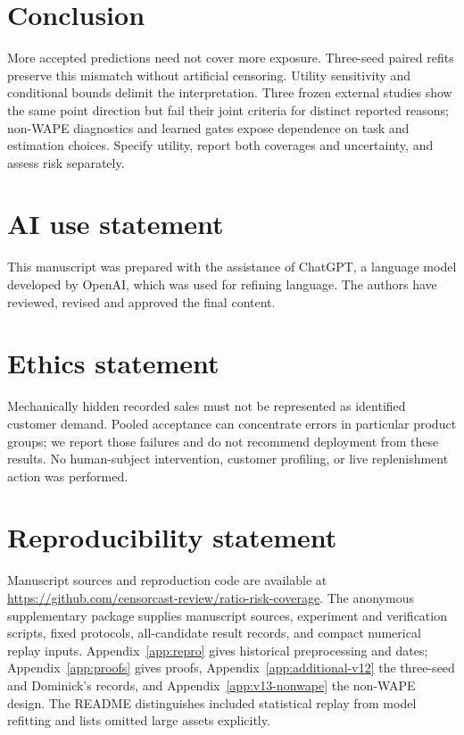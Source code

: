 \documentclass{article}
\begin{document}
\section{Conclusion}
More accepted predictions need not cover more exposure. Three-seed paired refits preserve this mismatch without artificial censoring. Utility sensitivity and conditional bounds delimit the interpretation. Three frozen external studies show the same point direction but fail their joint criteria for distinct reported reasons; non-WAPE diagnostics and learned gates expose dependence on task and estimation choices. Specify utility, report both coverages and uncertainty, and assess risk separately.

\label{end:main}

\clearpage
\section*{AI use statement}
This manuscript was prepared with the assistance of ChatGPT, a language model developed by OpenAI, which was used for refining language. The authors have reviewed, revised and approved the final content.

\section*{Ethics statement}
Mechanically hidden recorded sales must not be represented as identified customer demand. Pooled acceptance can concentrate errors in particular product groups; we report those failures and do not recommend deployment from these results. No human-subject intervention, customer profiling, or live replenishment action was performed.

\section*{Reproducibility statement}
Manuscript sources and reproduction code are available at \url{https://github.com/censorcast-review/ratio-risk-coverage}. The anonymous supplementary package supplies manuscript sources, experiment and verification scripts, fixed protocols, all-candidate result records, and compact numerical replay inputs. Appendix~\ref{app:repro} gives historical preprocessing and dates; Appendix~\ref{app:proofs} gives proofs, Appendix~\ref{app:additional-v12} the three-seed and Dominick's records, and Appendix~\ref{app:v13-nonwape} the non-WAPE design. The README distinguishes included statistical replay from model refitting and lists omitted large assets explicitly.
\end{document}
